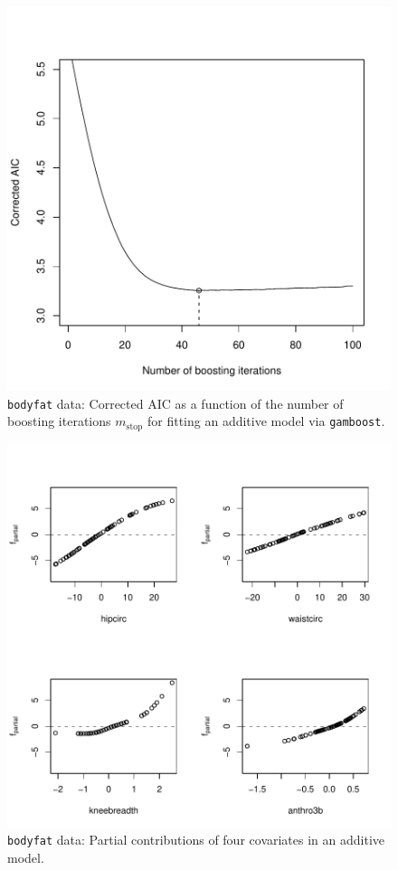 \documentclass{article}
\newcommand{\Robject}[1]{\texttt{#1}}
\newcommand{\Rcmd}[1]{\texttt{#1}}
\begin{document}
\begin{figure}
\begin{center}
\includegraphics{figures/BH-bodyfat-gamboost-AIC}
\caption{\Robject{bodyfat} data: Corrected AIC as a function of the number of 
boosting iterations $m_\text{stop}$ 
for fitting an additive model via \Rcmd{gamboost}. \label{bodyfat-gamboost-AIC}}
\end{center}
\end{figure}


\begin{figure}
\begin{center}
\includegraphics{figures/BH-bodyfat-gamboost-plot}
\caption{\Robject{bodyfat} data: Partial contributions of four covariates in an additive model. 
         \label{bodyfat-gamboost-plot}}
\end{center}
\end{figure}
\end{document}
